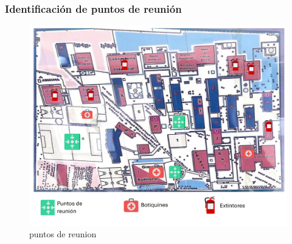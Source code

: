 \subsubsection{Identificación de puntos de reunión}
\begin{figure}[H]
    \centering
    \includegraphics[scale=0.25]{13/img/localizacionDeRecursos.pdf}
    \caption{puntos de reunion}
    \label{fig:puntos de reunion}
\end{figure}
% 
% 
